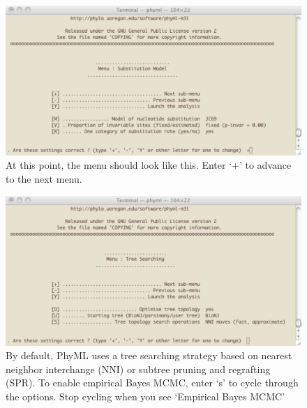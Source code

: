 \documentclass[11pt]{article}
\begin{document}
\begin{figure}[p]
\centering
\includegraphics[width=5.5 in]{GRAPHICS/b2.pdf}
\caption{At this point, the menu should look like this.  Enter `+' to advance to the next menu.}
\end{figure}
\clearpage

\begin{figure}[p]
\centering
\includegraphics[width=5.5 in]{GRAPHICS/b3.pdf}
\caption{By default, PhyML uses a tree searching strategy based on nearest neighbor interchange (NNI) or subtree pruning and regrafting (SPR).  To enable empirical Bayes MCMC, enter `s' to cycle through the options.  Stop cycling when you see `Empirical Bayes MCMC'}
\end{figure}
\clearpage
\end{document}
